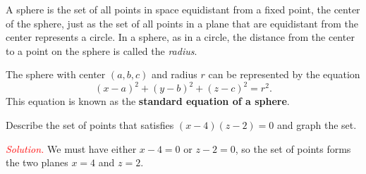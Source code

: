 \documentclass{report}
\begin{document}
    \pagebreak \bigbreak \noindent 
    \begin{dfn}
        A sphere is the set of all points in space equidistant from a fixed point, the center of the sphere, 
        just as the set of all points in a plane that are equidistant from the center represents a circle. 
        In a sphere, as in a circle, the distance from the center to a point on the sphere is called the \textit{radius}.
    \end{dfn}
    \bigbreak \noindent 
    \begin{thrmm}
        The sphere with center $(a,b,c)$ and radius $r$ can be represented by the equation
        \[
            (x - a)^2 + (y - b)^2 + (z - c)^2 = r^2.
        \]
        This equation is known as the \textbf{standard equation of a sphere}.
    \end{thrmm}

    \bigbreak \noindent 
    \begin{exm}
        Describe the set of points that satisfies  $(x-4)(z-2) = 0$ and graph the set.
        
    \end{exm}
    \bigbreak \noindent 
    \textcolor{red}{\textit{Solution.}}
    \bigbreak \noindent 
    We must have either $x - 4 = 0$ or $z - 2 = 0$, so the set of points forms the two planes $x = 4$ and $z = 2$.
    \bigbreak \noindent 

    \pagebreak 
    \bigbreak \noindent 
\end{document}
